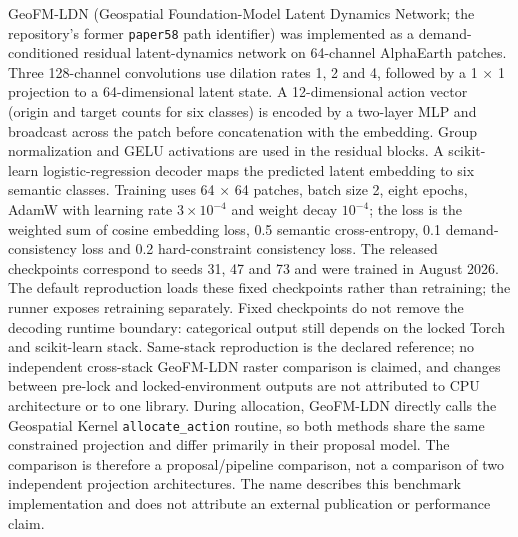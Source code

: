 GeoFM-LDN (Geospatial Foundation-Model Latent Dynamics Network; the
repository's former \texttt{paper58} path identifier) was implemented as
a demand-conditioned residual latent-dynamics network on 64-channel
AlphaEarth patches. Three 128-channel convolutions use dilation rates 1,
2 and 4, followed by a 1 × 1 projection to a 64-dimensional latent
state. A 12-dimensional action vector (origin and target counts for six
classes) is encoded by a two-layer MLP and broadcast across the patch
before concatenation with the embedding. Group normalization and GELU
activations are used in the residual blocks. A scikit-learn
logistic-regression decoder maps the predicted latent embedding to six
semantic classes. Training uses 64 × 64 patches, batch size 2, eight
epochs, AdamW with learning rate \(3\times10^{-4}\) and weight decay
\(10^{-4}\); the loss is the weighted sum of cosine embedding loss, 0.5
semantic cross-entropy, 0.1 demand-consistency loss and 0.2
hard-constraint consistency loss. The released checkpoints correspond to
seeds 31, 47 and 73 and were trained in August 2026. The default
reproduction loads these fixed checkpoints rather than retraining; the
runner exposes retraining separately. Fixed checkpoints do not remove
the decoding runtime boundary: categorical output still depends on the
locked Torch and scikit-learn stack. Same-stack reproduction is the
declared reference; no independent cross-stack GeoFM-LDN raster
comparison is claimed, and changes between pre-lock and
locked-environment outputs are not attributed to CPU architecture or to
one library. During allocation, GeoFM-LDN directly calls the Geospatial
Kernel \texttt{allocate\_action} routine, so both methods share the same
constrained projection and differ primarily in their proposal model. The
comparison is therefore a proposal/pipeline comparison, not a comparison
of two independent projection architectures. The name describes this
benchmark implementation and does not attribute an external publication
or performance claim.


